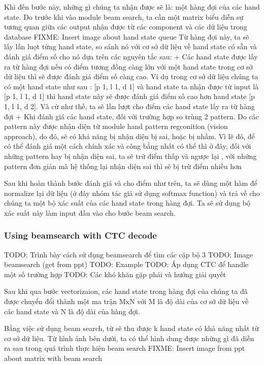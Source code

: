       Khi đến bước này, những gì chúng ta nhận được sẽ là: một hàng đợi của các hand state.
      Do trước khi vào module beam search, ta cần một matrix biểu diễn sự tương quan giữa các output nhận được từ các component và các dữ liệu trong database
      FIXME: Insert image about hand state queue
      Từ hàng đợi này, ta sẽ lấy lần luọt từng hand state, so sánh nó với cơ sở dữ liệu về hand state có sẵn 
      và đánh giá điểm số cho nó dựa trên các nguyên tắc sau:
        + Các hand state được lấy ra từ hàng đợi nếu có điểm tương đồng càng lớn với một hand state
        trong cơ sở dữ liệu thì sẽ được đánh giá điểm số càng cao. Ví dụ trong cơ sở dữ liệu chúng ta
        có một hand state như sau : [p 1, l 1, d 1] và hand state ta nhận được từ input là [p 1, l 1, d 1] thì hand state này sẽ
        được đánh giá điểm số cao hơn hand state [p 1, l 1, d 2]. Và cứ như thế, ta sẽ lần lượt cho điểm các hand state lấy ra từ hàng đợi
        + Khi đánh giá các hand state, đối với trường hợp so trùng 2 pattern. Do các pattern này được nhận diện từ module
        hand pattern regconition (vision approach), do đó, sẽ có khả năng bị nhận diện bị sai, hoặc bị nhầm. Vì lẽ đó, để có thể
        đánh giá một cách chính xác và công bằng nhất có thể thì ở đây, đối với những pattern hay bị nhận diện sai, ta sẽ trừ điểm thấp và ngược lại
        , với những pattern đơn giản mà hệ thống lại nhận diện sai thì sẽ bị trừ điểm nhiều hơn
      
      Sau khi hoàn thành bước đánh giá và cho điểm như trên, ta sẽ dùng một hàm để normalize
      lại dữ liệu (ở đây nhóm tác giả sử dụng softmax function) và trả về cho chúng ta một bộ xác suất của các hand state trong hàng đợi. Ta sẽ sử dụng bộ xác suất này
      làm input đầu vào cho bước beam search.
    \subsubsection{ Using beamsearch with CTC decode }
      TODO: Trình bày cách sử dụng beamsearch để tìm các cặp bộ 3
      TODO: Image beamsearch (get from ppt)
      TODO: Example
      TODO: Áp dụng CTC để handle một số trường hợp
      TODO: Các khó khăn gặp phải và hướng giải quyết
      
      Sau khi qua bước vectorizaion, các hand state trong hàng đợi của chúng ta
      đã được chuyển đổi thành một ma trận MxN với M là độ dài của cơ sở dữ liệu về
      các hand state và N là độ dài của hàng đợi.
      
      Bằng việc sử dụng beam search, từ sẽ thu được k hand state có khả năng nhất
      từ cơ sở dữ liệu. Từ hình ảnh bên dưới, ta có thể hình dung được những gì
      đã diễn ra sau trong quá trình thực hiện beam search
      FIXME: Insert image from ppt about matrix with beam search

